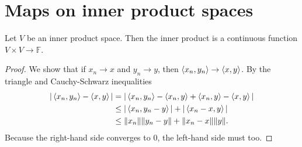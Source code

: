 \section{Maps on inner product spaces}

\begin{lemma}
Let $V$ be an inner product space. Then the inner product is a continuous function $V\times V \to \mathbb{F}$.
\end{lemma}
\begin{proof}
We show that if $x_n \to x$ and $y_n \to y$, then $\left\langle x_n,y_n \right\rangle\to \left\langle x,y \right\rangle$. By the triangle and Cauchy-Schwarz inequalities
\begin{align*}
|\left\langle x_n,y_n \right\rangle-\left\langle x,y \right\rangle| &= |\left\langle x_n,y_n \right\rangle-\left\langle x_n,y \right\rangle+\left\langle x_n,y \right\rangle - \left\langle x,y \right\rangle| \\
&\leq |\left\langle x_n, y_n-y \right\rangle| + |\left\langle x_n-x, y \right\rangle| \\
&\leq \lVert x_n\rVert\lVert y_n-y\rVert + \lVert x_n-x\rVert\lVert y\rVert.
\end{align*}
Because the right-hand side converges to $0$, the left-hand side must too.
\end{proof}

